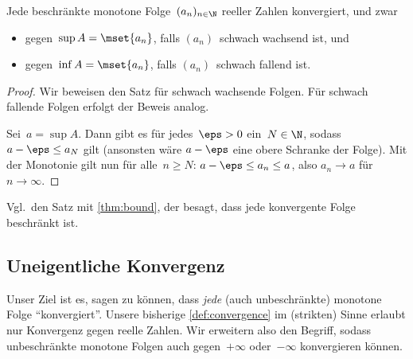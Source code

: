 \documentclass[a4paper]{article}
\begin{document}
\begin{theorem}\label{thm:bound2}
    Jede beschränkte monotone Folge~$(a_n)_{n\in\N}$ reeller Zahlen konvergiert, und zwar
    \begin{itemize}
        \item gegen~$\sup A = \mset{a_n}$, falls $(a_n)$~schwach wachsend ist, und
        \item gegen~$\inf A = \mset{a_n}$, falls $(a_n)$~schwach fallend ist.
    \end{itemize}
\end{theorem}

\begin{proof}
    Wir beweisen den Satz für schwach wachsende Folgen. Für schwach fallende Folgen erfolgt der Beweis analog.

    Sei~$a = \sup A$. Dann gibt es für jedes~$\eps > 0$ ein~$N \in \N$, sodass $a - \eps \leq a_N$ gilt (ansonsten wäre $a - \eps$ eine obere Schranke der Folge). Mit der Monotonie gilt nun für alle~$n \geq N$: $a - \eps \leq a_n \leq a$, also $a_n \to a$ für~$n \to \infty$.
\end{proof}

Vgl.~den Satz mit \cref{thm:bound}, der besagt, dass jede konvergente Folge beschränkt ist.

\subsection{Uneigentliche Konvergenz}

Unser Ziel ist es, sagen zu können, dass \emph{jede} (auch unbeschränkte) monotone Folge "`konvergiert"'. Unsere bisherige \cref{def:convergence} im (strikten) Sinne erlaubt nur Konvergenz gegen reelle Zahlen. Wir erweitern also den Begriff, sodass unbeschränkte monotone Folgen auch gegen~$+\infty$ oder~$-\infty$ konvergieren können.
\end{document}
